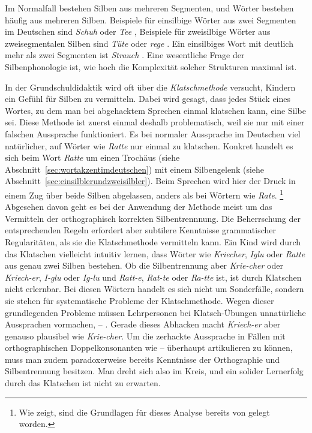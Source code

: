 Im Normalfall bestehen Silben aus mehreren Segmenten, und Wörter bestehen häufig aus mehreren Silben.
Beispiele für einsilbige Wörter aus zwei Segmenten im Deutschen sind \textit{Schuh} \textipa{[Su:]} oder \textit{Tee} \textipa{[te:]}, Beispiele für zweisilbige Wörter aus zweisegmentalen Silben sind \textit{Tüte} \textipa{[ty:t@]} oder \textit{rege} \textipa{[Ke:g@]}.
Ein einsilbiges Wort mit deutlich mehr als zwei Segmenten ist \textit{Strauch} \textipa{[StK\t{aO}X]}.
Eine wesentliche Frage der Silbenphonologie ist, wie hoch die Komplexität solcher Strukturen maximal ist.


In der Grundschuldidaktik wird oft über die \textit{Klatschmethode} versucht, Kindern ein Gefühl für Silben zu vermitteln.
Dabei wird gesagt, dass jedes Stück eines Wortes, zu dem man bei abgehacktem Sprechen einmal klatschen kann, eine Silbe sei.
Diese Methode ist zuerst einmal deshalb problematisch, weil sie nur mit einer falschen Aussprache funktioniert.
Es bei normaler Aussprache im Deutschen viel natürlicher, auf Wörter wie \textit{Ratte} \textipa{[Kat@]} nur einmal zu klatschen.
Konkret handelt es sich beim Wort \textit{Ratte} um einen Trochäus (siehe Abschnitt~\ref{sec:wortakzentimdeutschen}) mit einem Silbengelenk (siehe Abschnitt~\ref{sec:einsilblerundzweisilbler}).
Beim Sprechen wird hier der Druck in einem Zug über beide Silben abgelassen, anders als bei Wörtern wie \textit{Rate}.%
\footnote{Wie \citet[15--16]{Maas2002} zeigt, sind die Grundlagen für dieses Analyse bereits von \citet{Sievers1876} gelegt worden.}
Abgesehen davon geht es bei der Anwendung der Methode meist um das Vermitteln der orthographisch korrekten Silbentrennnung.
Die Beherrschung der entsprechenden Regeln erfordert aber subtilere Kenntnisse grammatischer Regularitäten, als sie die Klatschmethode vermitteln kann.
Ein Kind wird durch das Klatschen vielleicht intuitiv lernen, dass Wörter wie \textit{Kriecher}, \textit{Iglu} oder \textit{Ratte} aus genau zwei Silben bestehen.
Ob die Silbentrennung aber \textit{Krie-cher} oder \textit{Kriech-er}, \textit{I-glu} oder \textit{Ig-lu} und \textit{Ratt-e}, \textit{Rat-te} oder \textit{Ra-tte} ist, ist durch Klatschen nicht erlernbar.
Bei diesen Wörtern handelt es sich nicht um Sonderfälle, sondern sie stehen für systematische Probleme der Klatschmethode.
Wegen dieser grundlegenden Probleme müssen Lehrpersonen bei Klatsch-Übungen unnatürliche Aussprachen vormachen, \zB \textipa{[Kat]} -- \textipa{[te:]}.
Gerade dieses Abhacken macht \textit{Kriech-er} aber genauso plausibel wie \textit{Krie-cher}.
Um die zerhackte Aussprache in Fällen mit orthographischen Doppelkonsonanten wie \textipa{[Kat]} -- \textipa{[te:]} überhaupt artikulieren zu können, muss man zudem paradoxerweise bereits Kenntnisse der Orthographie und Silbentrennung besitzen.
Man dreht sich also im Kreis, und ein solider Lernerfolg durch das Klatschen ist nicht zu erwarten.

